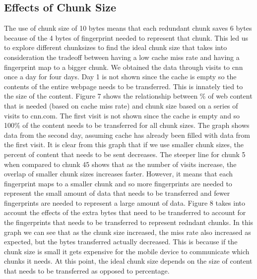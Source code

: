 \subsection{Effects of Chunk Size}
The use of chunk size of 10 bytes means that each redundant chunk saves 6 bytes because of the 4 bytes of fingerprint needed to represent that chunk. 
This led us to explore different chunksizes to find the ideal chunk size that takes into consideration the tradeoff between having a low cache miss rate and having a fingerprint map to a bigger chunk.  We obtained the data through visits to cnn once a day for four days. Day 1 is not shown since the cache is empty so the contents of the entire webpage needs to be transferred.
This is innately tied to the size of the content. Figure 7 shows the relationship between \% of web content that is needed (based on cache miss rate) and chunk size based on a series of visits to cnn.com. 
The first visit is not shown since the cache is empty and so 100\% of the content needs to be transferred for all chunk sizes. 
The graph shows data from the second day, assuming cache has already been filled with data from the first visit. 
It is clear from this graph that if we use smaller chunk sizes, the percent of content that needs to be sent decreases. 
The steeper line for chunk 5 when compared to chunk 45 shows that as the number of visits increase, the overlap of smaller chunk sizes increases faster.
However, it means that each fingerprint maps to a smaller chunk and so more fingerprints are needed to represent the small amount of data that needs to be transferred and fewer fingerprints are needed to represent a large amount of data. 
Figure 8 takes into account the effects of the extra bytes that need to be transferred to account for the fingerprints that needs to be transferred to represent redndant chunks. In this graph we can see that as the chunk size increased, the miss rate also increased as expected, but the bytes transferred actually decreased. 
This is because if the chunk size is small it gets expensive for the mobile device to communicate which chunks it needs. 
At this point, the ideal chunk size depends on the size of content that needs to be transferred as opposed to percentage.

